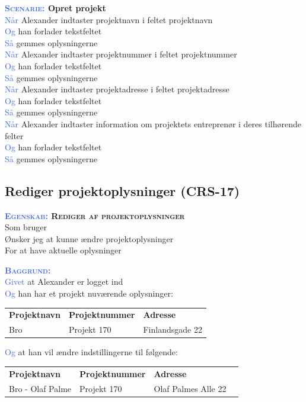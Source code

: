 \textbf{\textsc{\textcolor{RoyalBlue}{Scenarie:}} Opret projekt}\\
\textcolor{RoyalBlue}{Når} Alexander indtaster projektnavn i feltet projektnavn\\
\textcolor{RoyalBlue}{Og} han forlader tekstfeltet\\
\textcolor{RoyalBlue}{Så} gemmes oplysningerne\\
\textcolor{RoyalBlue}{Når} Alexander indtaster projektnummer i feltet projektnummer\\
\textcolor{RoyalBlue}{Og} han forlader tekstfeltet\\
\textcolor{RoyalBlue}{Så} gemmes oplysningerne\\
\textcolor{RoyalBlue}{Når} Alexander indtaster projektadresse i feltet projektadresse\\
\textcolor{RoyalBlue}{Og} han forlader tekstfeltet\\
\textcolor{RoyalBlue}{Så} gemmes oplysningerne\\
\textcolor{RoyalBlue}{Når} Alexander indtaster information om projektets entreprenør i deres tilhørende felter\\
\textcolor{RoyalBlue}{Og} han forlader tekstfeltet\\
\textcolor{RoyalBlue}{Så} gemmes oplysningerne\\

\subsection{Rediger projektoplysninger (CRS-17)} \label{sec:USRedigerProjekt}
\textbf{\textsc{\textcolor{RoyalBlue}{Egenskab:} Rediger af projektoplysninger}}\\
Som bruger\\
Ønsker jeg at kunne ændre projektoplysninger\\
For at have aktuelle oplysninger

\textsc{\textcolor{RoyalBlue}{\textbf{Baggrund:}}}\\
\textcolor{RoyalBlue}{Givet} at Alexander er logget ind\\
\textcolor{RoyalBlue}{Og} han har et projekt nuværende oplysninger:\\
\begin{tabular}{| l | l | l |}
	\textbf{Projektnavn} & \textbf{Projektnummer} & \textbf{Adresse} \\
	Bro & Projekt 170 & Finlandsgade 22 \\
\end{tabular}
\newline \newline
\textcolor{RoyalBlue}{Og} at han vil ændre indstillingerne til følgende:\\
\begin{tabular}{| l | l | l | l |}
	\textbf{Projektnavn} & \textbf{Projektnummer} & \textbf{Adresse} \\
	Bro - Olaf Palme & Projekt 170 & Olaf Palmes Alle 22 \\
\end{tabular}
\newline

